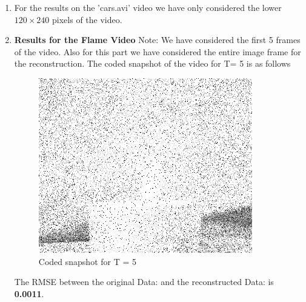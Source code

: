 \documentclass[12pt]{article}
\begin{document}
\begin{itemize}
\begin{enumerate}
    \item For the results on the 'cars.avi' video we have only considered the lower $120 \times 240$ pixels of the video.
    \item \textbf{Results for the Flame Video}
    Note: We have considered the first 5 frames of the video. Also for this part we have considered the entire image frame for the reconstruction.
    The coded snapshot of the video for T= 5 is as follows
    \begin{figure}[H]
        \centering
        \includegraphics[width=0.5\linewidth]{results/flame_noisy_snapshot_5.png}
        \caption*{Coded snapshot for T = 5}
    \end{figure}

    The RMSE between the original Data: and the reconstructed Data: is \textbf{0.0011}. \\


\end{enumerate}
\end{itemize}
\end{document}
